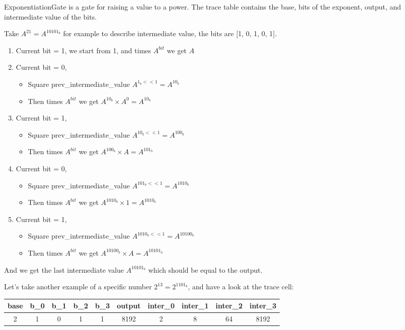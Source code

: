 
\hspace*{\fill}

\indent ExponentiationGate is a gate for raising a value to a power. The trace table contains the base, bits of the exponent, output, and intermediate value of the bits.

Take $A^{21} = A^{10101_b}$ for example to describe intermediate value, the bits are [1, 0, 1, 0, 1].

\begin{enumerate}
    \item Current bit = 1, we start from 1, and times $A^{bit}$ we get $A$
    \item Current bit = 0,
    \begin{itemize}
        \item Square prev\_intermediate\_value $A^{1_b << 1} = A^{10_b}$
        \item Then times $A^{bit}$ we get $A^{10_b} \times A^0 = A^{10_b}$
    \end{itemize}
    \item Current bit = 1,
    \begin{itemize}
        \item Square prev\_intermediate\_value $A^{10_b << 1} = A^{100_b}$
        \item Then times $A^{bit}$ we get $A^{100_b} \times A = A^{101_b}$
    \end{itemize}
    \item Current bit = 0,
    \begin{itemize}
        \item Square prev\_intermediate\_value $A^{101_b << 1} = A^{1010_b}$
        \item Then times $A^{bit}$ we get $A^{1010_b} \times 1 = A^{1010_b}$
    \end{itemize}
    \item Current bit = 1,
    \begin{itemize}
        \item Square prev\_intermediate\_value $A^{1010_b << 1} = A^{10100_b}$
        \item Then times $A^{bit}$ we get $A^{10100_b} \times A = A^{10101_b}$
    \end{itemize}
\end{enumerate}

And we get the last intermediate value $A^{10101_b}$ which should be equal to the output.

Let's take another example of a specific number $2^{13} = 2^{1101_b}$, and have a look at the trace cell:
\begin{center}
    \begin{tabular}{ |c|c|c|c|c|c|c|c|c|c| }
        \hline
        base & b\_0 & b\_1 & b\_2 & b\_3 & output & inter\_0 & inter\_1 & inter\_2 & inter\_3 \\
        \hline
        2 & 1 & 0 & 1 & 1 & 8192 & 2 & 8 & 64 & 8192 \\
        \hline
    \end{tabular}
\end{center}

